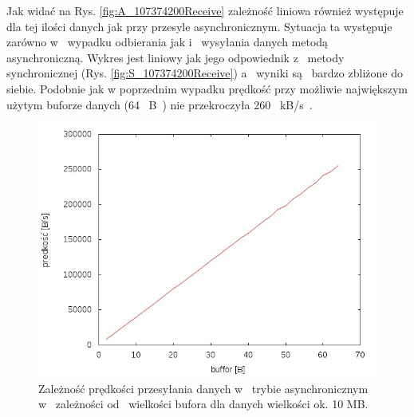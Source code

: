 \documentclass{BscUS}
\begin{document}
\noindent Jak widać na Rys. \ref{fig:A_107374200Receive} zależność liniowa również występuje dla tej ilości danych jak przy przesyle asynchronicznym. Sytuacja ta występuje zarówno w~ wypadku odbierania jak i~ wysyłania danych metodą asynchroniczną. Wykres jest liniowy jak jego odpowiednik z~ metody synchronicznej (Rys. \ref{fig:S_107374200Receive}) a~ wyniki są~ bardzo zbliżone do siebie. Podobnie jak w poprzednim wypadku prędkość przy możliwie największym użytym buforze danych (64~ B~) nie przekroczyła 260~ kB/s~.


\begin{figure}[H]
{
\centering
\captionsetup{justification=centering}
\includegraphics[width=1\textwidth]{./img/A_10737420Receive}
\caption{Zależność prędkości przesyłania danych w~ trybie asynchronicznym w~ zależności od~ wielkości bufora dla danych wielkości ok. 10 MB.}
\label{fig:A_10737420Receive}
}
\end{figure}
\end{document}
